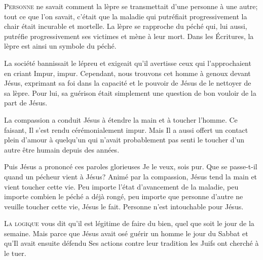 \lettrine{P}{ersonne} ne savait comment la lèpre se transmettait
 d'une personne à une autre; tout ce que l'on savait, c'était que la maladie
 \ocadr qui putréfiait progressivement la chair \fcadr{}
 était incurable et mortelle. La lèpre se rapproche du péché qui,
 lui aussi, putréfie progressivement ses victimes et mène à leur mort.
 Dans les Écritures, la lèpre est ainsi un symbole du péché. 

La société bannissait le lépreu et exigeait qu'il avertisse
 ceux qui l'approchaient en criant\frcolon{} 
 \Og Impur, impur. \Fg{}
 Cependant, nous trouvons cet homme à genoux devant Jésus,
 exprimant sa foi dans la capacité et le pouvoir de Jésus
 de le nettoyer de sa lèpre. Pour lui, sa guérison était simplement
 une question de bon vouloir de la part de Jésus. 


La compassion a conduit Jésus à étendre la main et à toucher l'homme.
 Ce faisant, Il s'est rendu cérémonialement impur.
 Mais Il a aussi offert un contact plein d'amour à quelqu'un
 qui n'avait probablement pas senti le toucher d'un autre être humain
 depuis des années. 

Puis Jésus a prononcé ces paroles glorieuses\frcolon{} 
 \Og Je le veux, sois pur. \Fg{}
 Que se passe-t-il quand un pécheur vient à Jésus?
 Animé par la compassion, Jésus tend la main et vient toucher cette vie.
 Peu importe l'état d'avancement de la maladie,
 peu importe combien le péché a déjà rongé, peu importe que personne
 d'autre ne veuille toucher cette vie, Jésus le fait.
 Personne n'est intouchable pour Jésus. 

\dvrule






\lettrine{L}{a logique} vous dit qu'il est légitime de faire du bien,
 quel que soit le jour de la semaine.
 Mais parce que Jésus avait osé guérir un homme le jour du Sabbat
 \ocadr et qu'Il avait ensuite défendu Ses actions contre leur tradition \fcadr{}
 les Juifs ont cherché à le tuer.

